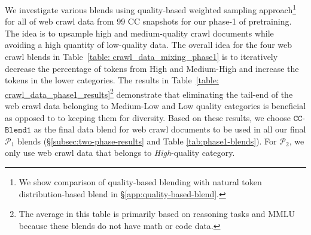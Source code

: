 \documentclass[11pt]{article}
\newcommand{\phaseone}{$\mathcal{P}_1$\xspace}
\newcommand{\phasetwo}{$\mathcal{P}_2$\xspace}
\begin{document}
We investigate various blends using quality-based weighted sampling approach\footnote{We show comparison of quality-based blending with natural token distribution-based blend in \S\ref{app:quality-based-blend}.} for all of web crawl data from 99 CC snapshots for our phase-1 of pretraining.
The idea is to upsample high and medium-quality crawl documents while avoiding a high quantity of low-quality data.
The overall idea for the four web crawl blends in Table~\ref{table: crawl_data_mixing_phase1} is to iteratively decrease the percentage of tokens from High and Medium-High and increase the tokens in the lower categories.
The results in Table~\ref{table: crawl_data_phase1_results}\footnote{The average in this table is primarily based on reasoning tasks and MMLU because these blends do not have math or code data.} demonstrate that eliminating the tail-end of the web crawl data belonging to Medium-Low and Low quality categories is beneficial as opposed to to keeping them for diversity.
Based on these results, we choose $\mathtt{CC}$-$\mathtt{Blend1}$ as the final data blend for web crawl documents to be used in all our final \phaseone blends (\S\ref{subsec:two-phase-results} and Table \ref{tab:phase1-blends}).
For \phasetwo, we only use web crawl data that belongs to \textit{High}-quality category.
\end{document}
